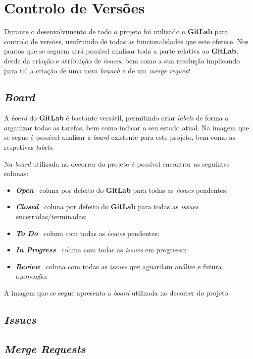 \section{Controlo de Versões}

Durante o desenvolvimento de todo o projeto foi utilizado o \textbf{GitLab} para controlo de versões, usufruindo de todas as funcionalidades que este oferece. Nos pontos que se seguem será possível analisar toda a parte relativa ao \textbf{GitLab}, desde da criação e atribuição de \textit{issues}, bem como a sua resolução implicando para tal a criação de uma nova \textit{branch} e de um \textit{merge request}.

\subsection{\textit{Board}}

A \textit{board} do \textbf{GitLab} é bastante versátil, permitindo criar \textit{labels} de forma a organizar todas as tarefas, bem como indicar o seu estado atual. Na imagem que se segue é possível analisar a \textit{board} existente para este projeto, bem como as respetivas \textit{labels}.

Na \textit{board} utilizada no decorrer do projeto é possível encontrar as seguintes colunas:

\begin{itemize}
	\item \textbf{\textit{Open}} \textemdash~coluna por defeito do \textbf{GitLab} para todas as \textit{issues} pendentes;
	\item \textbf{\textit{Closed}} \textemdash~coluna por defeito do \textbf{GitLab} para todas as \textit{issues} encerradas/terminadas;
	\item \textbf{\textit{To Do}} \textemdash~coluna com todas as \textit{issues} pendentes;
	\item \textbf{\textit{In Progress}} \textemdash~coluna com todas as \textit{issues} em progresso;
	\item \textbf{\textit{Review}} \textemdash~coluna com todas as \textit{issues} que aguardam análise e futura aprovação.
\end{itemize}

A imagem que se segue apresenta a \textit{board} utilizada no decorrer do projeto.


\subsection{\textit{Issues}}

\subsection{\textit{Merge Requests}}